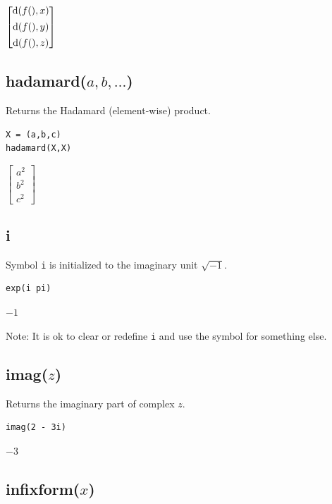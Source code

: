 \documentclass[12pt]{article}
\begin{document}
\noindent
$\displaystyle
\begin{bmatrix}
{\rm d}(f(),x)
\\[1ex]
{\rm d}(f(),y)
\\[1ex]
{\rm d}(f(),z)
\end{bmatrix}
$

\subsection*{hadamard($a,b,\ldots$)}

Returns the Hadamard (element-wise) product.

{\color{blue}
\begin{verbatim}
X = (a,b,c)
hadamard(X,X)
\end{verbatim}
}

\noindent
$\displaystyle
\begin{bmatrix}
a^2
\\[1ex]
b^2
\\[1ex]
c^2
\end{bmatrix}
$

\subsection*{i}

Symbol {\tt i} is initialized to the imaginary unit $\sqrt{-1}$.

{\color{blue}
\begin{verbatim}
exp(i pi)
\end{verbatim}
}

\noindent
$-1$

\bigskip
\noindent
Note: It is ok to clear or redefine {\tt i} and use the symbol for something else.

\subsection*{imag($z$)}

Returns the imaginary part of complex $z$.

{\color{blue}
\begin{verbatim}
imag(2 - 3i)
\end{verbatim}
}

\noindent
$-3$

\subsection*{infixform($x$)}
\end{document}
